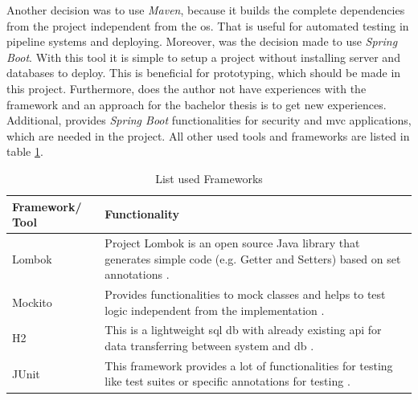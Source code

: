 Another decision was to use \textit{Maven}, because it builds the complete dependencies from the project independent from the \gls{os}. That is useful for automated testing in pipeline systems and deploying. \newline
Moreover, was the decision made to use \textit{Spring Boot}. With this tool it is simple to setup a project without installing server and databases to deploy. This is beneficial for prototyping, which should be made in this project. Furthermore, does the author not have experiences with the framework and an approach for the bachelor thesis is to get new experiences. Additional, provides \textit{Spring Boot} functionalities for security and \gls{mvc} applications, which are needed in the project. \newline
All other used tools and frameworks are listed in table \ref{tab:frameworks}.

\begin{table}[h!]
	\begin{tabular}{|p{2cm}|p{13cm}|} \hline
		\rowcolor{Gray}Framework/ Tool & Functionality \\ \hline
		Lombok & Project Lombok is an open source Java library that generates simple code (e.g. Getter and Setters) based on set annotations \parencite{lombok2018}.\\ \hline
		Mockito & Provides functionalities to mock classes and helps to test logic independent from the implementation \parencite{mockito2018}. \\ \hline
		H2 & This is a lightweight \gls{sql} \gls{db} with already existing \gls{api} for data transferring between system and \gls{db} \parencite{hs2018}. \\ \hline
		JUnit & This framework provides a lot of functionalities for testing like test suites or specific annotations for testing \parencite{junit2018}. \\ \hline
	\end{tabular}
	\centering
	\caption{List used Frameworks}
	\label{tab:frameworks}
\end{table}

